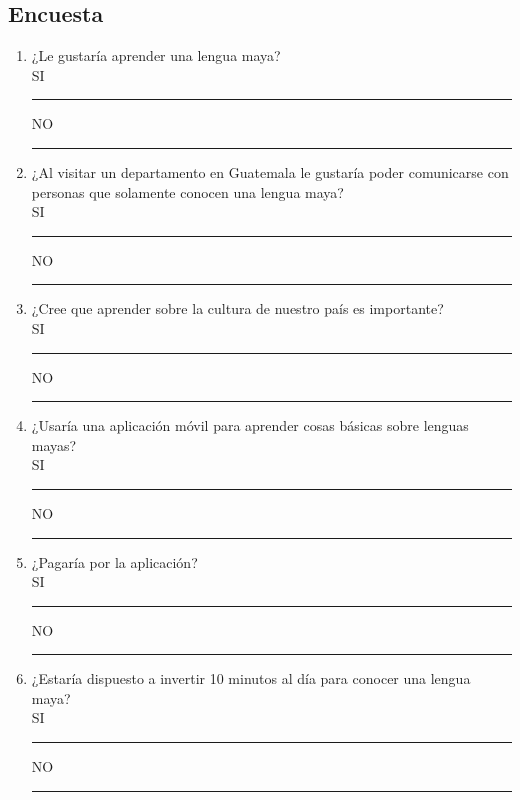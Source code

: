 \documentclass[a4paper,openright,11pt]{article}
\begin{document}
\subsection{Encuesta}
\begin{enumerate}
	\item ¿Le gustaría aprender una lengua maya?\\
	SI \rule{10mm}{0.1mm}  \hspace{5cm} NO \rule{10mm}{0.1mm}
	\item ¿Al visitar un departamento en Guatemala le gustaría poder comunicarse con personas que solamente conocen una lengua maya?	\\
	SI \rule{10mm}{0.1mm}  \hspace{5cm} NO \rule{10mm}{0.1mm}
	\item ¿Cree que aprender sobre la cultura de nuestro país es importante?\\
	SI \rule{10mm}{0.1mm}  \hspace{5cm} NO \rule{10mm}{0.1mm}
	\item ¿Usaría una aplicación móvil para aprender cosas básicas sobre lenguas mayas?\\
	SI \rule{10mm}{0.1mm}  \hspace{5cm} NO \rule{10mm}{0.1mm}
	\item ¿Pagaría por la aplicación?\\
	SI \rule{10mm}{0.1mm}  \hspace{5cm} NO \rule{10mm}{0.1mm}
	\item ¿Estaría dispuesto a invertir 10 minutos al día para conocer una lengua maya?\\
	SI \rule{10mm}{0.1mm}  \hspace{5cm} NO \rule{10mm}{0.1mm}
\end{enumerate}

\newpage
\end{document}
